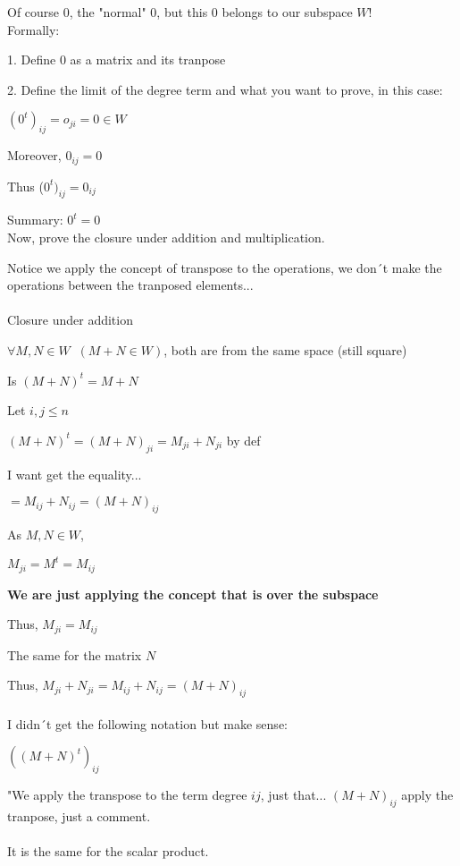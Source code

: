 \documentclass{article}
\begin{document}
Of course 0, the "normal" 0, but this 0 belongs to our subspace \(W\)!
\\

Formally:

1. Define 0 as a matrix and its tranpose

2. Define the limit of the degree term and what you want to prove, in this case:

\((0^t)_{ij} = o_{ji} = 0 \in W\)

Moreover, \(0_{ij} = 0\)

Thus (\(0^t)_{ij} = 0_{ij}\)

Summary: \(0^t = 0\)
\\

Now, prove the closure under addition and multiplication.

Notice we apply the concept of transpose to the operations, we don´t make the operations between the tranposed elements...
\\
\\
Closure under addition

\(\forall M, N \in W \;\;(M+N\in W)\), both are from the same space (still square)

Is \((M+N )^t = M+N\)

Let \(i,j \leq n\)

\((M+N)^t = (M+N)_{ji} 

= M_{ji} + N_{ji}\) by def

I want get the equality...

\(= M_{ij} + N_{ij} = (M+N)_{ij}\)

As \(M,N \in W\),

\(M_{ji} = M^t = M_{ij}\)

\textbf{We are just applying the concept that is over the subspace}

Thus, \(M_{ji} = M_{ij}\)

The same for the matrix \(N\)

Thus, \(M_{ji} + N_{ji} = M_{ij} + N_{ij} = (M+N)_{ij}\)
\\
\\
I didn´t get the following notation but make sense:

\(((M+N)^t)_{ij}\)

"We apply the transpose to the term degree \(ij\), just that... \((M+N)_{ij}\) apply the tranpose, just a comment.
\\
\\
It is the same for the scalar product.
\\
\\
\end{document}

